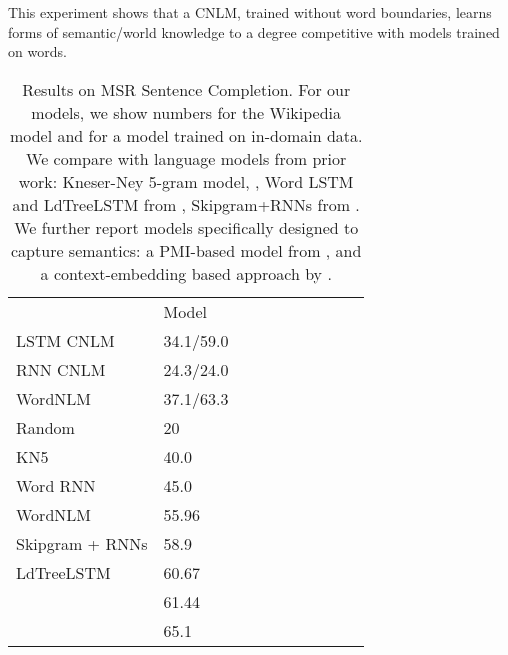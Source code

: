 This experiment shows that a CNLM, trained without word boundaries, learns forms of semantic/world knowledge to a degree competitive with models trained on words.

\begin{table}[t]
  \begin{center}
    \begin{tabular}{l|l|l|l|llllll}
      \multicolumn{1}{c}{}& Model \\
LSTM CNLM	    &      34.1/59.0 \\ %
	    RNN CNLM &     24.3/24.0 \\ %
	    WordNLM & 37.1/63.3 \\ \hline %
	    Random & 20 \\
	    KN5   & 40.0 \\
            Word RNN & 45.0 \\
	    WordNLM  & 55.96 \\
Skipgram + RNNs  & 58.9 \\
LdTreeLSTM  & 60.67 \\
            \citet{woods2016exploiting} &  61.44 \\
\citet{melamud2016context2vec} & 65.1 \\
    \end{tabular}
  \end{center}
	\caption{\label{tab:msr-completion-results} Results on MSR Sentence Completion. For our models, we show numbers for the Wikipedia model and for a model trained on in-domain data. We compare with language models from prior work: Kneser-Ney 5-gram model, , Word LSTM and LdTreeLSTM from , Skipgram+RNNs from . We further report models specifically designed to capture semantics: a PMI-based model from \citet{woods2016exploiting}, and a context-embedding based approach by \citet{melamud2016context2vec}.}
\end{table}



